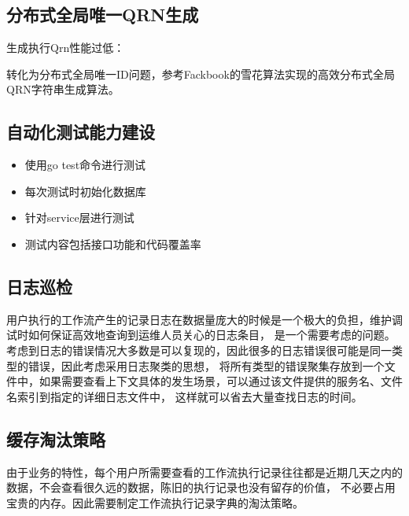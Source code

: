 \subsection{分布式全局唯一QRN生成}
生成执行Qrn性能过低：

转化为分布式全局唯一ID问题，参考Fackbook的雪花算法实现的高效分布式全局QRN字符串生成算法。

\subsection{自动化测试能力建设}

\begin{itemize}
    \item 使用go test命令进行测试
    \item 每次测试时初始化数据库
    \item 针对service层进行测试
    \item 测试内容包括接口功能和代码覆盖率
\end{itemize}

\subsection{日志巡检}

用户执行的工作流产生的记录日志在数据量庞大的时候是一个极大的负担，维护调试时如何保证高效地查询到运维人员关心的日志条目，
是一个需要考虑的问题。考虑到日志的错误情况大多数是可以复现的，因此很多的日志错误很可能是同一类型的错误，因此考虑采用日志聚类的思想，
将所有类型的错误聚集存放到一个文件中，如果需要查看上下文具体的发生场景，可以通过该文件提供的服务名、文件名索引到指定的详细日志文件中，
这样就可以省去大量查找日志的时间。

\subsection{缓存淘汰策略}

由于业务的特性，每个用户所需要查看的工作流执行记录往往都是近期几天之内的数据，不会查看很久远的数据，陈旧的执行记录也没有留存的价值，
不必要占用宝贵的内存。因此需要制定工作流执行记录字典的淘汰策略。
